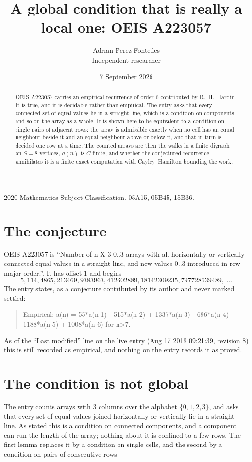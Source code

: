 \documentclass[11pt,a4paper]{article}
\title{A global condition that is really a local one: OEIS A223057}
\author{Adrian Perez Fontelles\\ \small Independent researcher}
\date{7 September 2026}
\theoremstyle{plain}
\theoremstyle{definition}
\begin{document}
\maketitle

\begin{abstract}
OEIS A223057 carries an empirical recurrence of order $6$ contributed by R.~H.~Hardin. It is
true, and it is decidable rather than empirical. The entry asks that every connected set of
equal values lie in a straight line, which is a condition on components and so on the array as
a whole. It is shown here to be equivalent to a condition on single pairs of adjacent rows:
the array is admissible exactly when no cell has an equal neighbour beside it and an equal
neighbour above or below it, and that in turn is decided one row at a time. The counted arrays
are then the walks in a finite digraph on $S=8$ vertices, $a(n)$ is $C$-finite, and whether
the conjectured recurrence annihilates it is a finite exact computation with Cayley--Hamilton
bounding the work.
\end{abstract}

\noindent\small 2020 Mathematics Subject Classification. 05A15, 05B45, 15B36.\normalsize

\section{The conjecture}

OEIS A223057 is ``Number of n X 3 0..3 arrays with all horizontally or vertically connected equal values in a straight line, and new values 0..3 introduced in row major order.''. It has offset $1$ and begins
\[
5, 114, 4865, 213469, 9383963, 412602889, 18142309235, 797728639489,\ \dots
\]
The entry states, as a conjecture contributed by its author and never marked settled:
\begin{quote}
Empirical: a(n) = 55*a(n-1) - 515*a(n-2) + 1337*a(n-3) - 696*a(n-4) - 1188*a(n-5) + 1008*a(n-6) for n>7.
\end{quote}
As of the ``Last modified'' line on the live entry (Aug 17 2018 09:21:39, revision 8) this is still
recorded as empirical, and nothing on the entry records it as proved.

\section{The condition is not global}

The entry counts arrays with $3$ columns over the alphabet $\{0,1,2,3\}$, and asks that every set of equal values joined horizontally or vertically lie in a straight line. As stated this is a condition on connected components, and a component can run the length of the array; nothing about it is confined to a few rows. The first lemma replaces it by a condition on single cells, and the second by a condition on pairs of consecutive rows.
\end{document}
